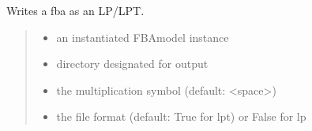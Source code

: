 \documentclass[letterpaper,12pt,english]{sphinxmanual}
\begin{document}
\begin{fulllineitems}

\pysigstartsignatures
\pysiglinewithargsret
{}
{\sphinxparamcomma {}\sphinxparamcomma {}\sphinxparamcomma {}\sphinxparamcomma {}\sphinxparamcomma {}\sphinxparamcomma {}}
{}
\pysigstopsignatures
\sphinxAtStartPar
Writes a fba as an LP/LPT.
\begin{quote}\begin{description}
\begin{itemize}
\item {} 
\sphinxAtStartPar
{} \textendash{} an instantiated FBAmodel instance

\item {} 
\sphinxAtStartPar
{} \textendash{} directory designated for output

\item {} 
\sphinxAtStartPar
{} \textendash{} the multiplication symbol (default: \textless{}space\textgreater{})

\item {} 
\sphinxAtStartPar
{} \textendash{} the file format (default: True for lpt) or False for lp

\end{itemize}

\end{description}\end{quote}

\end{fulllineitems}
\end{document}
